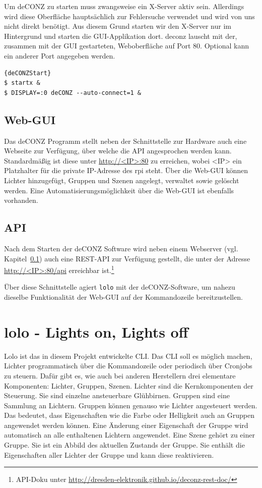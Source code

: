 \documentclass[a4paper,12pt]{article}
\begin{document}
Um deCONZ zu starten muss zwangsweise ein X-Server aktiv sein. Allerdings wird
diese Oberfläche hauptsächlich zur Fehlersuche verwendet und wird von uns nicht
direkt benötigt. Aus diesem Grund starten wir den X-Server nur im Hintergrund
und starten die GUI-Applikation dort. \acrshort{deconz} lauscht mit der,
zusammen mit der GUI gestarteten, Weboberfläche auf Port 80. Optional kann ein
anderer Port angegeben werden.

\begin{lstlisting}[caption=deCONZ starten]{deCONZStart}
$ startx &
$ DISPLAY=:0 deCONZ --auto-connect=1 &
\end{lstlisting}

\subsection{Web-GUI}
\label{ss:webgui}

Das deCONZ Programm stellt neben der Schnittstelle zur Hardware auch eine
Webseite zur Verfügung, über welche die API angesprochen werden kann.
Standardmäßig ist diese unter \url{http://<IP>:80} zu erreichen, wobei <IP> ein
Platzhalter für die private IP-Adresse des \gls{rpi} steht. Über die Web-GUI
können Lichter hinzugefügt, Gruppen und Szenen angelegt, verwaltet sowie
gelöscht werden. Eine Automatisierungsmöglichkeit über die Web-GUI ist
ebenfalls vorhanden.

\subsection{API}

Nach dem Starten der deCONZ Software wird neben einem Webserver (vgl.
Kapitel~\ref{ss:webgui}) auch eine REST-API zur Verfügung gestellt, die unter
der Adresse \url{http://<IP>:80/api} erreichbar ist.\footnote{API-Doku unter
\url{http://dresden-elektronik.github.io/deconz-rest-doc/}}

Über diese Schnittstelle agiert \texttt{lolo} mit der deCONZ-Software, um
nahezu dieselbe Funktionalität der Web-GUI auf der Kommandozeile
bereitzustellen.

\newpage

\section{lolo - Lights on, Lights off}
\label{lolo}

Lolo ist das in diesem Projekt entwickelte CLI. Das CLI soll es möglich machen,
Lichter programmatisch über die Kommandozeile oder periodisch über Cronjobs zu
steuern. Dafür gibt es, wie auch bei anderen Herstellern drei elementare
Komponenten: Lichter, Gruppen, Szenen. Lichter sind die Kernkomponenten der
Steuerung. Sie sind einzelne ansteuerbare Glühbirnen. Gruppen sind eine
Sammlung an Lichtern. Gruppen können genauso wie Lichter angesteuert werden.
Das bedeutet, dass Eigenschaften wie die Farbe oder Helligkeit auch an Gruppen
angewendet werden können. Eine Änderung einer Eigenschaft der Gruppe wird
automatisch an alle enthaltenen Lichtern angewendet. Eine Szene gehört zu einer
Gruppe. Sie ist ein Abbild des aktuellen Zustands der Gruppe. Sie enthält die
Eigenschaften aller Lichter der Gruppe und kann diese reaktivieren.
\end{document}
